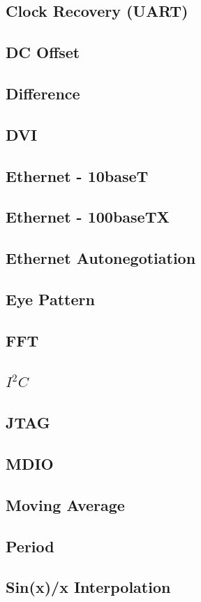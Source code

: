 \documentclass[11pt]{article}
\begin{document}
\subsection{Clock Recovery (UART)}
\subsection{DC Offset}
\subsection{Difference}
\subsection{DVI}
\subsection{Ethernet - 10baseT}
\subsection{Ethernet - 100baseTX}
\subsection{Ethernet Autonegotiation}
\subsection{Eye Pattern}
\subsection{FFT}
\subsection{$I^2C$}
\subsection{JTAG}
\subsection{MDIO}
\subsection{Moving Average}
\subsection{Period}
\subsection{Sin(x)/x Interpolation}
\end{document}
